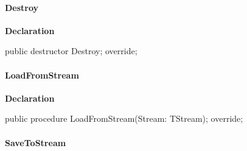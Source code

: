 \documentclass{report}
\newif\ifpdf
\begin{document}
\paragraph*{Destroy}\hspace*{\fill}

\label{opbitmapformats.TBMPImage-Destroy}
\begin{list}{}{
\setlength{\itemindent}{0cm}
\setlength{\listparindent}{0cm}
\setlength{\leftmargin}{\evensidemargin}
\addtolength{\leftmargin}{\tmplength}
\settowidth{\labelsep}{X}
\addtolength{\leftmargin}{\labelsep}
\setlength{\labelwidth}{\tmplength}
}
\item[\textbf{Declaration}\hfill]
\ifpdf
\begin{flushleft}
\fi
\begin{ttfamily}
public destructor Destroy; override;\end{ttfamily}

\ifpdf
\end{flushleft}
\fi

\end{list}
\paragraph*{LoadFromStream}\hspace*{\fill}

\label{opbitmapformats.TBMPImage-LoadFromStream}
\begin{list}{}{
\setlength{\itemindent}{0cm}
\setlength{\listparindent}{0cm}
\setlength{\leftmargin}{\evensidemargin}
\addtolength{\leftmargin}{\tmplength}
\settowidth{\labelsep}{X}
\addtolength{\leftmargin}{\labelsep}
\setlength{\labelwidth}{\tmplength}
}
\item[\textbf{Declaration}\hfill]
\ifpdf
\begin{flushleft}
\fi
\begin{ttfamily}
public procedure LoadFromStream(Stream: TStream); override;\end{ttfamily}

\ifpdf
\end{flushleft}
\fi

\end{list}
\paragraph*{SaveToStream}\hspace*{\fill}
\end{document}
